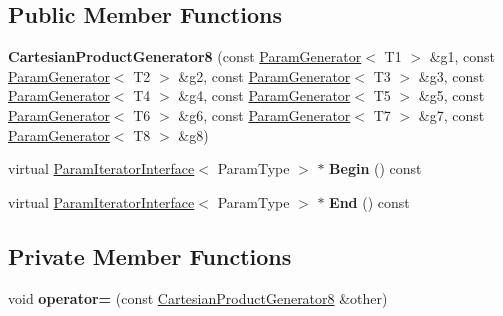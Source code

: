 \subsection*{Public Member Functions}
\begin{DoxyCompactItemize}
\item 
\mbox{\label{classtesting_1_1internal_1_1_cartesian_product_generator8_a07f33a7263f933d4fbabdb9e930d7f86}} 
{\bfseries Cartesian\+Product\+Generator8} (const \mbox{\hyperlink{classtesting_1_1internal_1_1_param_generator}{Param\+Generator}}$<$ T1 $>$ \&g1, const \mbox{\hyperlink{classtesting_1_1internal_1_1_param_generator}{Param\+Generator}}$<$ T2 $>$ \&g2, const \mbox{\hyperlink{classtesting_1_1internal_1_1_param_generator}{Param\+Generator}}$<$ T3 $>$ \&g3, const \mbox{\hyperlink{classtesting_1_1internal_1_1_param_generator}{Param\+Generator}}$<$ T4 $>$ \&g4, const \mbox{\hyperlink{classtesting_1_1internal_1_1_param_generator}{Param\+Generator}}$<$ T5 $>$ \&g5, const \mbox{\hyperlink{classtesting_1_1internal_1_1_param_generator}{Param\+Generator}}$<$ T6 $>$ \&g6, const \mbox{\hyperlink{classtesting_1_1internal_1_1_param_generator}{Param\+Generator}}$<$ T7 $>$ \&g7, const \mbox{\hyperlink{classtesting_1_1internal_1_1_param_generator}{Param\+Generator}}$<$ T8 $>$ \&g8)
\item 
\mbox{\label{classtesting_1_1internal_1_1_cartesian_product_generator8_a7a8d51311f6fda872c66a9a921fd0ae6}} 
virtual \mbox{\hyperlink{classtesting_1_1internal_1_1_param_iterator_interface}{Param\+Iterator\+Interface}}$<$ Param\+Type $>$ $\ast$ {\bfseries Begin} () const
\item 
\mbox{\label{classtesting_1_1internal_1_1_cartesian_product_generator8_a397d020313918686b0b8cf5963526472}} 
virtual \mbox{\hyperlink{classtesting_1_1internal_1_1_param_iterator_interface}{Param\+Iterator\+Interface}}$<$ Param\+Type $>$ $\ast$ {\bfseries End} () const
\end{DoxyCompactItemize}
\subsection*{Private Member Functions}
\begin{DoxyCompactItemize}
\item 
\mbox{\label{classtesting_1_1internal_1_1_cartesian_product_generator8_a5729e1c7969f8b5039b6d35813ce2c3e}} 
void {\bfseries operator=} (const \mbox{\hyperlink{classtesting_1_1internal_1_1_cartesian_product_generator8}{Cartesian\+Product\+Generator8}} \&other)
\end{DoxyCompactItemize}
